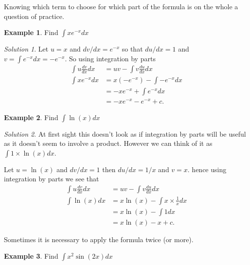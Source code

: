 \documentclass[
  11pt,
  oneside]{book}
\newcommand{\slide}{}
\theoremstyle{definition}
\theoremstyle{definition}
\newtheorem{example}{Example}[chapter]
\theoremstyle{definition}
\theoremstyle{definition}
\theoremstyle{remark}
\newtheorem*{solution}{Solution}
\begin{document}
Knowing which term to choose for which part of the formula is on the whole a question of practice.

\slide

\begin{example}
Find \(\displaystyle\int xe^{-x}dx\)
\end{example}

\begin{solution}
Let \(u = x\) and \(dv/dx=e^{-x}\) so that \(du/dx = 1\) and \(v=\displaystyle\int e^{-x}dx = -e^{-x}\). So using integration by parts
\begin{align*}
\int u\frac{dv}{dx}dx& = uv-\int v\frac{du}{dx}dx\\
\int xe^{-x}dx&=x(-e^{-x})-\int-e^{-x}dx\\
&=-xe^{-x}+\int e^{-x}dx\\
&=-xe^{-x}-e^{-x}+c.
\end{align*}
\end{solution}

\slide

\begin{example}
Find \(\displaystyle\int \ln(x)dx\)
\end{example}

\begin{solution}
At first sight this doesn't look as if integration by parts will be useful as it doesn't seem to involve a product. However we can think of it as \(\displaystyle\int 1\times\ln(x)dx\).

Let \(u = \ln(x)\) and \(dv/dx = 1\) then \(du/dx = 1/x\) and \(v = x\). hence using integration by parts we see that
\begin{align*}
\int u\frac{dv}{dx}dx& = uv-\int v\frac{du}{dx}dx\\
\int\ln(x)dx&=x\ln(x)-\int x\times\frac 1x dx\\
&=x\ln(x)-\int 1dx\\
&=x\ln(x)-x + c.
\end{align*}
\end{solution}

\slide

Sometimes it is necessary to apply the formula twice (or more).

\begin{example}
Find \(\displaystyle\int x^2\sin(2x)dx\)
\end{example}
\end{document}
